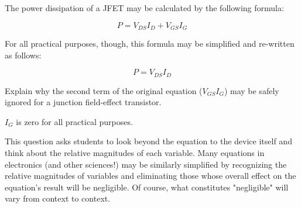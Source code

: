 

The power dissipation of a JFET may be calculated by the following formula:

$$P = V_{DS}I_D + V_{GS}I_G$$

For all practical purposes, though, this formula may be simplified and re-written as follows:

$$P = V_{DS}I_D$$

Explain why the second term of the original equation ($V_{GS}I_G$) may be safely ignored for a junction field-effect transistor.







$I_G$ is zero for all practical purposes.







This question asks students to look beyond the equation to the device itself and think about the relative magnitudes of each variable.  Many equations in electronics (and other sciences!) may be similarly simplified by recognizing the relative magnitudes of variables and eliminating those whose overall effect on the equation's result will be negligible.  Of course, what constitutes "negligible" will vary from context to context.




